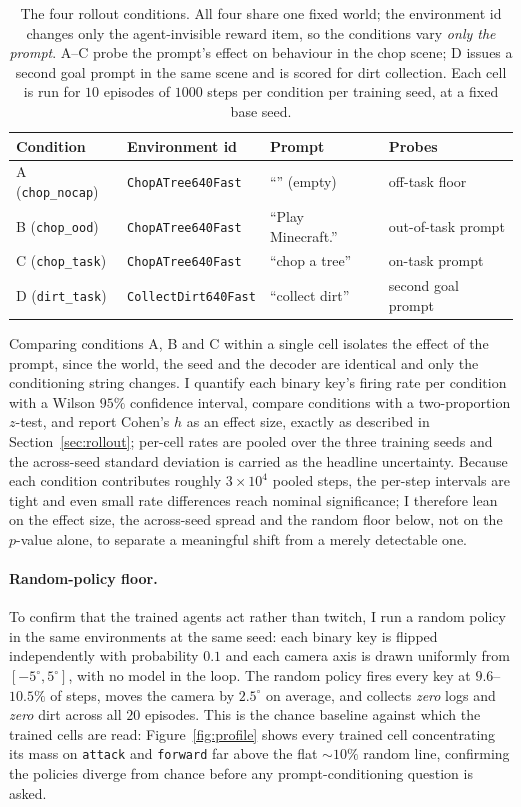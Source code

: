\begin{table}[ht]
\centering
\begin{tabular}{llll}
\hline
Condition & Environment id & Prompt & Probes \\
\hline
A (\texttt{chop\_nocap}) & \texttt{ChopATree640Fast} & \enquote{} (empty)       & off-task floor \\
B (\texttt{chop\_ood})   & \texttt{ChopATree640Fast} & \enquote{Play Minecraft.} & out-of-task prompt \\
C (\texttt{chop\_task})  & \texttt{ChopATree640Fast} & \enquote{chop a tree}     & on-task prompt \\
D (\texttt{dirt\_task})  & \texttt{CollectDirt640Fast} & \enquote{collect dirt}  & second goal prompt \\
\hline
\end{tabular}
\caption{The four rollout conditions. All four share one fixed world; the
environment id changes only the agent-invisible reward item, so the conditions
vary \emph{only the prompt}. A--C probe the prompt's effect on behaviour in the
chop scene; D issues a second goal prompt in the same scene and is scored for
dirt collection. Each cell is run for $10$ episodes of $1000$ steps per
condition per training seed, at a fixed base seed.}
\label{tab:conditions}
\end{table}

Comparing conditions A, B and C within a single cell isolates the effect of the
prompt, since the world, the seed and the decoder are identical and only the
conditioning string changes. I quantify each binary key's firing rate per
condition with a Wilson $95\%$ confidence interval, compare conditions with a
two-proportion $z$-test, and report Cohen's $h$ as an effect size, exactly as
described in Section~\ref{sec:rollout}; per-cell rates are pooled over the three
training seeds and the across-seed standard deviation is carried as the headline
uncertainty. Because each condition contributes roughly $3\times10^4$ pooled
steps, the per-step intervals are tight and even small rate differences reach
nominal significance; I therefore lean on the effect size, the across-seed
spread and the random floor below, not on the $p$-value alone, to separate a
meaningful shift from a merely detectable one.

\paragraph{Random-policy floor.} To confirm that the trained agents act rather
than twitch, I run a random policy in the same environments at the same seed:
each binary key is flipped independently with probability $0.1$ and each camera
axis is drawn uniformly from $[-5^\circ,5^\circ]$, with no model in the loop.
The random policy fires every key at $9.6$--$10.5\%$ of steps, moves the camera
by $2.5^\circ$ on average, and collects \emph{zero} logs and \emph{zero} dirt
across all $20$ episodes. This is the chance baseline against which the trained
cells are read: Figure~\ref{fig:profile} shows every trained cell concentrating
its mass on \texttt{attack} and \texttt{forward} far above the flat $\sim\!10\%$
random line, confirming the policies diverge from chance before any
prompt-conditioning question is asked.

